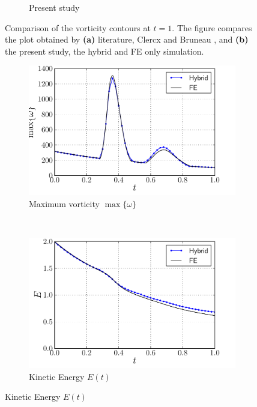 \begin{figure}[!p]
\begin{subfigure}[t]{0.5\textwidth}
             \caption{Present study}
             \label{fig:hybrid_dipole_contourLine_t1p0}
     \end{subfigure}
     \caption{Comparison of the vorticity contours at $t=1$. The figure compares the plot obtained by \textbf{(a)} literature, Clercx and Bruneau \cite{Clercx2006a}, and \textbf{(b)} the present study, the hybrid and FE only simulation.}
     \label{fig:hybrid_vorticity_contour_comparison}
	\end{figure}	

	\begin{figure}[!p]
     \centering
     \begin{subfigure}[t]{0.49\textwidth}
             \includegraphics[width=\textwidth]{./figures/hybrid/cbColl/hybrid_doubleMonopole_parameter_wMax.pdf}
             \caption{Maximum vorticity $\max\{\omega\}$}
             \label{fig:hybrid_dipole_maxVorticity_comparison}
     \end{subfigure}%
     ~ %
     \begin{subfigure}[t]{0.49\textwidth}
             \includegraphics[width=\textwidth]{./figures/hybrid/cbColl/hybrid_doubleMonopole_parameter_E.pdf}
             \caption{Kinetic Energy $E(t)$}
             \label{fig:hybrid_dipole_KineticEnergy_comparison}
     \end{subfigure}
     

\end{figure}
